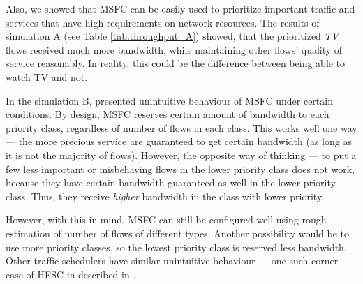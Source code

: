 Also, we showed that MSFC can be easily used to prioritize important traffic and services that have high requirements on network resources. The results of simulation A (see Table \ref{tab:throughput_A}) showed, that the prioritized \emph{TV} flows received much more bandwidth, while maintaining other flows' quality of service reasonably. In reality, this could be the difference between being able to watch TV and not. 

In the simulation B, presented unintuitive behaviour of MSFC under certain conditions. By design, MSFC reserves certain amount of bandwidth to each priority class, regardless of number of flows in each class. This works well one way --- the more precious service are guaranteed to get certain bandwidth (as long as it is not the majority of flows). However, the opposite way of thinking --- to put a few less important or misbehaving flows in the lower priority class does not work, because they have certain bandwidth guaranteed as well in the lower priority class. Thus, they receive \emph{higher} bandwidth in the class with lower priority.

However, with this in mind, MSFC can still be configured well using rough estimation of number of flows of different types. Another possibility would be to use more priority classes, so the lowest priority class is reserved less bandwidth. Other traffic schedulers have similar unintuitive behaviour --- one such corner case of HFSC in described in \cite[Corner cases]{hfscMan}.











